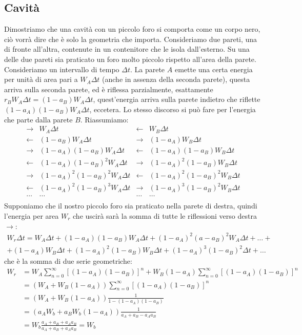 \subsection{Cavità}
Dimostriamo che una cavità con un piccolo foro si comporta come un corpo nero, ciò vorrà dire che è solo la geometria che importa. Consideriamo due pareti, una di fronte all'altra, contenute in un contenitore che le isola dall'esterno. Su una delle due pareti sia praticato un foro molto piccolo rispetto all'area della parete. Consideriamo un intervallo di tempo $\Delta t$. La parete $A$ emette una certa energia per unità di area pari a $W_A\Delta t$ (anche in assenza della seconda parete), questa arriva sulla seconda parete, ed è riflessa parzialmente, esattamente $r_BW_A\Delta t=(1-a_B)W_A\Delta t$, quest'energia arriva sulla parete indietro che riflette $(1-a_A)(1-a_B)W_A\Delta t$, eccetera. Lo stesso discorso si può fare per l'energia che parte dalla parete $B$. Riassumiamo:
\begin{equation}
\begin{array}{cl|cl}
\rightarrow&W_A\Delta t&\leftarrow&W_B\Delta t\\
\leftarrow&(1-a_B)W_A\Delta t&\rightarrow&(1-a_A)W_B\Delta t\\
\rightarrow&(1-a_A)(1-a_B)W_A\Delta t&\leftarrow&(1-a_A)(1-a_B)W_B\Delta t\\
\leftarrow&(1-a_A)(1-a_B)^2W_A\Delta t&\rightarrow&(1-a_A)^2(1-a_B)W_B\Delta t\\
\rightarrow&(1-a_A)^2(1-a_B)^2W_A\Delta t&\leftarrow&(1-a_A)^2(1-a_B)^2W_B\Delta t\\
\leftarrow&(1-a_A)^2(1-a_B)^3W_A\Delta t&\rightarrow&(1-a_A)^3(1-a_B)^2W_B\Delta t\\
\ldots&\ldots&\ldots&\ldots\\
\end{array}
\end{equation}
Supponiamo che il nostro piccolo foro sia praticato nella parete di destra, quindi l'energia per area $W_r$ che uscirà sarà la somma di tutte le riflessioni verso destra $\rightarrow$:
\begin{multline}
W_r\Delta t=W_A\Delta t+(1-a_A)(1-a_B)W_A\Delta t+(1-a_A)^2(a-a_B)^2W_A\Delta t+\ldots+\\+(1-a_A)W_B\Delta t+(1-a_A)^2(1-a_B)W_B\Delta t+(1-a_A)^3(1-a_B)^2\Delta t+\ldots
\end{multline}
che è la somma di due serie geometriche:
\begin{equation}
\begin{split}
W_r&=W_A\sum_{n=0}^\infty\left[(1-a_A)(1-a_B)\right]^n+W_B(1-a_A)\sum_{n=0}^\infty\left[(1-a_A)(1-a_B)\right]^n\\
&=\left(W_A+W_B\left(1-a_A\right)\right)\sum_{n=0}^\infty\left[(1-a_A)(1-a_B)\right]^n\\
&=\left(W_A+W_B\left(1-a_A\right)\right)\frac{1}{1-(1-a_A)(1-a_B)}\\
&=\left(a_AW_b+a_BW_b(1-a_A)\right)\frac{1}{a_A+a_B-a_Aa_B}\\
&=W_b\frac{a_A+a_B+a_Aa_B}{a_A+a_B+a_Aa_B}=W_b
\end{split}
\end{equation}
